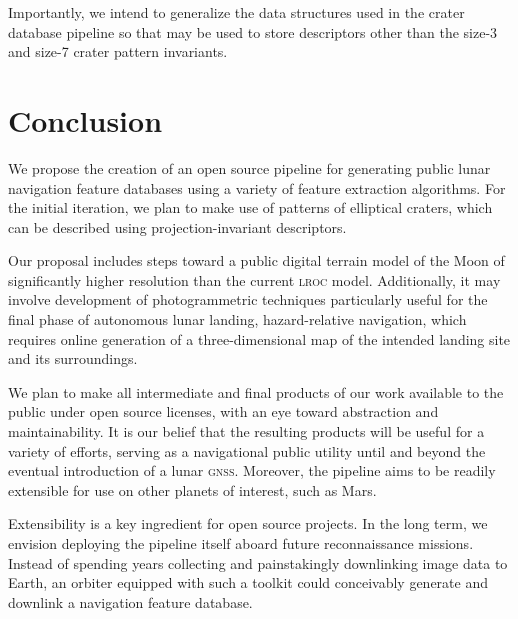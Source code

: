 \documentclass[12pt]{olfmemo}
\begin{document}
Importantly, we intend to generalize the data structures used in the crater database pipeline so that may be used to store descriptors other than the size-3 and size-7 crater pattern invariants.

\section{Conclusion}
We propose the creation of an open source pipeline for generating public lunar navigation feature databases using a variety of feature extraction algorithms. For the initial iteration, we plan to make use of patterns of elliptical craters, which can be described using projection-invariant descriptors.

Our proposal includes steps toward a public digital terrain model of the Moon of significantly higher resolution than the current \textsc{lroc} model. Additionally, it may involve development of photogrammetric techniques particularly useful for the final phase of autonomous lunar landing, hazard-relative navigation, which requires online generation of a three-dimensional map of the intended landing site and its surroundings.

We plan to make all intermediate and final products of our work available to the public under open source licenses, with an eye toward abstraction and maintainability. It is our belief that the resulting products will be useful for a variety of efforts, serving as a navigational public utility until and beyond the eventual introduction of a lunar \textsc{gnss}. Moreover, the pipeline aims to be readily extensible for use on other planets of interest, such as Mars.

Extensibility is a key ingredient for open source projects. In the long term, we envision deploying the pipeline itself aboard future reconnaissance missions. Instead of spending years collecting and painstakingly downlinking image data to Earth, an orbiter equipped with such a toolkit could conceivably generate and downlink a navigation feature database.


\end{document}
